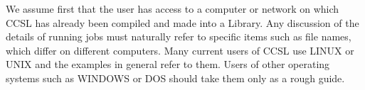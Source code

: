 %
%
\startdocument
\label{chap:7}
We assume first that the user has access to a computer or network
on which CCSL has already been compiled and made into a Library.\p
Any discussion of the details of running jobs must naturally refer to
specific items such as file names, which differ on different computers.
Many current users of CCSL use  LINUX or UNIX
and the examples in general refer to them. Users of other operating
systems such as WINDOWS or DOS should take them only as a rough guide. 

